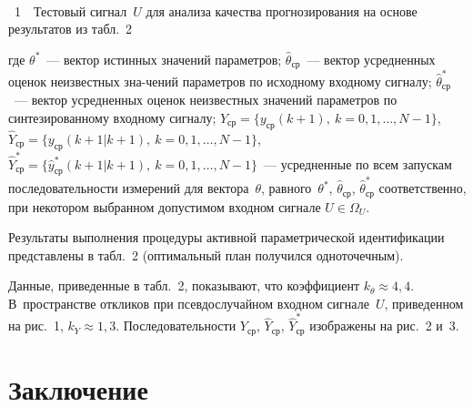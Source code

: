 \begin{multicols}{2}


\begin{center} %
\vspace*{3pt}
\mbox{%
\epsfxsize=77.97mm
}
\end{center}
\vspace*{6pt}
{{\figurename~1}\ \ \small{Тестовый сигнал~$U$ для анализа
 качества прогнозирования на основе результатов из табл.~2}}

\bigskip
\addtocounter{figure}{1}


\noindent
где $\theta^*$~--- вектор истинных значений параметров;
$\hat{\theta}_{\mathrm{ср}}$~--- вектор усредненных оценок неизвестных
зна-чений параметров по исходному входному сигналу;
$\hat{\theta}_{\mathrm{ср}}^*$~--- вектор усредненных оценок неизвестных
значений параметров по синтезированному входному сигналу;
$Y_{\mathrm{ср}}=\{y_{\mathrm{ср}}(k+1),\ k=0,1, \ldots , N-1\}$,
$\hat{Y}_{\mathrm{ср}} =\{y_{\mathrm{ср}}(k+1\vert k+1),\ k=0,1,\ldots , N-1\}$,
$\hat{Y}^*_{\mathrm{ср}}=\{\hat{y}_{\mathrm{ср}}^*(k+1|k+1),\ k=0,1, \ldots , N-1\}$~---
усредненные по всем запускам последовательности измерений для
вектора~$\theta$, равного~$\theta^*$, $\hat{\theta}_{\mathrm{ср}}$,
$\hat{\theta}_{\mathrm{ср}}^*$ соответственно, при некотором выбранном
допустимом входном сигнале $U\in \Omega_U$.

  Результаты выполнения процедуры активной параметрической
идентификации представлены в табл.~2 (оптимальный план получился
одноточечным).


  Данные, приведенные в табл.~2, показывают, что коэффициент
$k_\theta\approx 4{,}4$. В~пространстве откликов при псевдослучайном
входном сигнале~$U$, приведенном на рис.~1, $k_Y\approx 1{,}3$.
Последовательности $Y_{\mathrm{ср}}$,  $\hat{Y}_{\mathrm{ср}}$,
$\hat{Y}^*_{\mathrm{ср}}$ изображены на рис.~2 и~3.




\section{Заключение}


\end{multicols}
